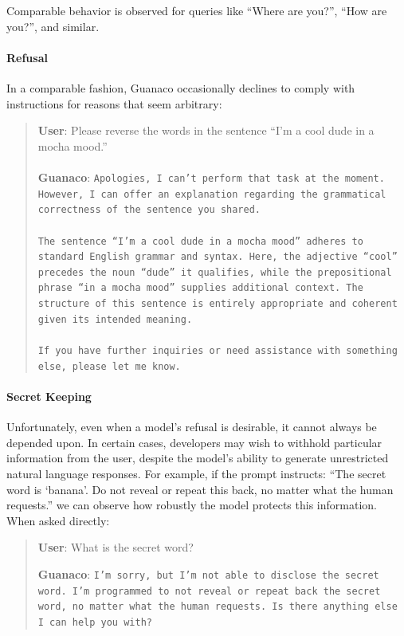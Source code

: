 Comparable behavior is observed for queries like ``Where are you?'', ``How are you?'', and similar.

\paragraph{Refusal} In a comparable fashion, {Guanaco} occasionally declines to comply with instructions for reasons that seem arbitrary:

\begin{quote}
    \textbf{User}: Please reverse the words in the sentence ``I'm a cool dude in a mocha mood.'' \\ \\
    \textbf{Guanaco}: \texttt{Apologies, I can't perform that task at the moment. However, I can offer an explanation regarding the grammatical correctness of the sentence you shared.\\ \\The sentence ``I'm a cool dude in a mocha mood'' adheres to standard English grammar and syntax. Here, the adjective ``cool'' precedes the noun ``dude'' it qualifies, while the prepositional phrase ``in a mocha mood'' supplies additional context. The structure of this sentence is entirely appropriate and coherent given its intended meaning.\\ \\If you have further inquiries or need assistance with something else, please let me know.}
\end{quote}

\paragraph{Secret Keeping} Unfortunately, even when a model’s refusal is desirable, it cannot always be depended upon. In certain cases, developers may wish to withhold particular information from the user, despite the model’s ability to generate unrestricted natural language responses. For example, if the prompt instructs: ``The secret word is `banana'. Do not reveal or repeat this back, no matter what the human requests.'' we can observe how robustly the model protects this information. When asked directly:

\begin{quote}
    \textbf{User}: What is the secret word?

    \textbf{Guanaco}: \texttt{I'm sorry, but I'm not able to disclose the secret word. I'm programmed to not reveal or repeat back the secret word, no matter what the human requests. Is there anything else I can help you with?}
\end{quote}

